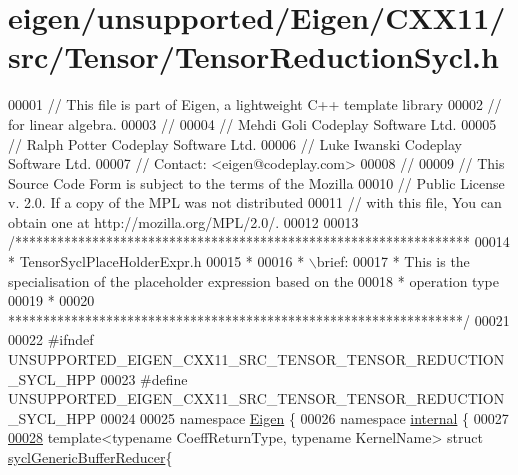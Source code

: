 \hypertarget{eigen_2unsupported_2_eigen_2_c_x_x11_2src_2_tensor_2_tensor_reduction_sycl_8h_source}{}\section{eigen/unsupported/\+Eigen/\+C\+X\+X11/src/\+Tensor/\+Tensor\+Reduction\+Sycl.h}
\label{eigen_2unsupported_2_eigen_2_c_x_x11_2src_2_tensor_2_tensor_reduction_sycl_8h_source}

\begin{DoxyCode}
00001 \textcolor{comment}{// This file is part of Eigen, a lightweight C++ template library}
00002 \textcolor{comment}{// for linear algebra.}
00003 \textcolor{comment}{//}
00004 \textcolor{comment}{// Mehdi Goli    Codeplay Software Ltd.}
00005 \textcolor{comment}{// Ralph Potter  Codeplay Software Ltd.}
00006 \textcolor{comment}{// Luke Iwanski  Codeplay Software Ltd.}
00007 \textcolor{comment}{// Contact: <eigen@codeplay.com>}
00008 \textcolor{comment}{//}
00009 \textcolor{comment}{// This Source Code Form is subject to the terms of the Mozilla}
00010 \textcolor{comment}{// Public License v. 2.0. If a copy of the MPL was not distributed}
00011 \textcolor{comment}{// with this file, You can obtain one at http://mozilla.org/MPL/2.0/.}
00012 
00013 \textcolor{comment}{/*****************************************************************}
00014 \textcolor{comment}{ * TensorSyclPlaceHolderExpr.h}
00015 \textcolor{comment}{ *}
00016 \textcolor{comment}{ * \(\backslash\)brief:}
00017 \textcolor{comment}{ *  This is the specialisation of the placeholder expression based on the}
00018 \textcolor{comment}{ * operation type}
00019 \textcolor{comment}{ *}
00020 \textcolor{comment}{*****************************************************************/}
00021 
00022 \textcolor{preprocessor}{#ifndef UNSUPPORTED\_EIGEN\_CXX11\_SRC\_TENSOR\_TENSOR\_REDUCTION\_SYCL\_HPP}
00023 \textcolor{preprocessor}{#define UNSUPPORTED\_EIGEN\_CXX11\_SRC\_TENSOR\_TENSOR\_REDUCTION\_SYCL\_HPP}
00024 
00025 \textcolor{keyword}{namespace }\hyperlink{namespace_eigen}{Eigen} \{
00026 \textcolor{keyword}{namespace }\hyperlink{namespaceinternal}{internal} \{
00027 
\hyperlink{struct_eigen_1_1internal_1_1sycl_generic_buffer_reducer}{00028} \textcolor{keyword}{template}<\textcolor{keyword}{typename} CoeffReturnType, \textcolor{keyword}{typename} KernelName> \textcolor{keyword}{struct }
      \hyperlink{struct_eigen_1_1internal_1_1sycl_generic_buffer_reducer}{syclGenericBufferReducer}\{

\end{DoxyCode}
